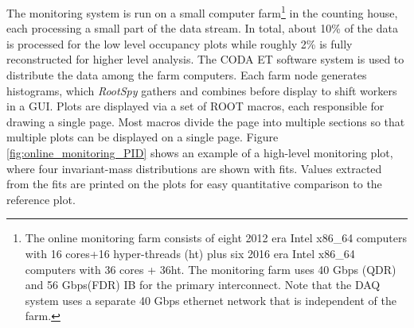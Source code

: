 The monitoring system is run on a small computer farm\footnote{The online monitoring farm consists of eight 2012 era Intel x86\_64 computers with 16 cores+16 hyper-threads (ht) plus six 2016 era Intel x86\_64 computers with 36 cores + 36ht. The monitoring farm uses 40 Gbps (QDR) and 56 Gbps(FDR) IB for the primary interconnect. Note that the DAQ system uses a separate 40 Gbps ethernet network that is independent of the farm.} in the counting house, each processing a small part of the data stream. In total, about 10\% of the data is processed for the low level occupancy plots while roughly 2\% is fully reconstructed for higher level analysis. The CODA ET software system is used to distribute the data among the farm computers. Each farm node generates histograms, which \textit{RootSpy} gathers and combines before display to shift workers in a GUI.
Plots are displayed via a set of ROOT macros, each responsible for drawing a single page. Most macros divide the page into multiple sections so that multiple plots can be displayed on a single page. Figure \ref{fig:online_monitoring_PID} shows an example of a high-level monitoring plot, where four invariant-mass distributions are shown with fits. Values extracted from the fits are printed on the plots for easy quantitative comparison to the reference plot. 



